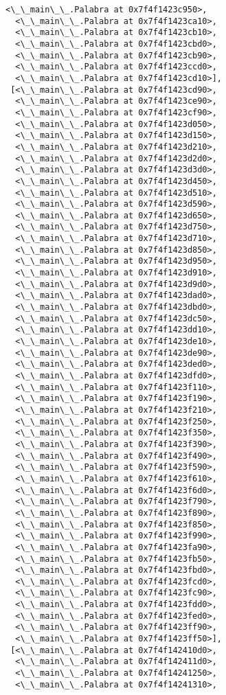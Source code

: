 \documentclass[12pt,a4paper,table]{article}
\begin{document}
\begin{tcolorbox}[breakable, size=fbox, boxrule=.5pt, pad at break*=1mm, opacityfill=0]
\begin{Verbatim}[commandchars=\\\{\}]
  <\_\_main\_\_.Palabra at 0x7f4f1423c950>,
  <\_\_main\_\_.Palabra at 0x7f4f1423ca10>,
  <\_\_main\_\_.Palabra at 0x7f4f1423cb10>,
  <\_\_main\_\_.Palabra at 0x7f4f1423cbd0>,
  <\_\_main\_\_.Palabra at 0x7f4f1423cb90>,
  <\_\_main\_\_.Palabra at 0x7f4f1423ccd0>,
  <\_\_main\_\_.Palabra at 0x7f4f1423cd10>],
 [<\_\_main\_\_.Palabra at 0x7f4f1423cd90>,
  <\_\_main\_\_.Palabra at 0x7f4f1423ce90>,
  <\_\_main\_\_.Palabra at 0x7f4f1423cf90>,
  <\_\_main\_\_.Palabra at 0x7f4f1423d050>,
  <\_\_main\_\_.Palabra at 0x7f4f1423d150>,
  <\_\_main\_\_.Palabra at 0x7f4f1423d210>,
  <\_\_main\_\_.Palabra at 0x7f4f1423d2d0>,
  <\_\_main\_\_.Palabra at 0x7f4f1423d3d0>,
  <\_\_main\_\_.Palabra at 0x7f4f1423d450>,
  <\_\_main\_\_.Palabra at 0x7f4f1423d510>,
  <\_\_main\_\_.Palabra at 0x7f4f1423d590>,
  <\_\_main\_\_.Palabra at 0x7f4f1423d650>,
  <\_\_main\_\_.Palabra at 0x7f4f1423d750>,
  <\_\_main\_\_.Palabra at 0x7f4f1423d710>,
  <\_\_main\_\_.Palabra at 0x7f4f1423d850>,
  <\_\_main\_\_.Palabra at 0x7f4f1423d950>,
  <\_\_main\_\_.Palabra at 0x7f4f1423d910>,
  <\_\_main\_\_.Palabra at 0x7f4f1423d9d0>,
  <\_\_main\_\_.Palabra at 0x7f4f1423dad0>,
  <\_\_main\_\_.Palabra at 0x7f4f1423dbd0>,
  <\_\_main\_\_.Palabra at 0x7f4f1423dc50>,
  <\_\_main\_\_.Palabra at 0x7f4f1423dd10>,
  <\_\_main\_\_.Palabra at 0x7f4f1423de10>,
  <\_\_main\_\_.Palabra at 0x7f4f1423de90>,
  <\_\_main\_\_.Palabra at 0x7f4f1423ded0>,
  <\_\_main\_\_.Palabra at 0x7f4f1423dfd0>,
  <\_\_main\_\_.Palabra at 0x7f4f1423f110>,
  <\_\_main\_\_.Palabra at 0x7f4f1423f190>,
  <\_\_main\_\_.Palabra at 0x7f4f1423f210>,
  <\_\_main\_\_.Palabra at 0x7f4f1423f250>,
  <\_\_main\_\_.Palabra at 0x7f4f1423f350>,
  <\_\_main\_\_.Palabra at 0x7f4f1423f390>,
  <\_\_main\_\_.Palabra at 0x7f4f1423f490>,
  <\_\_main\_\_.Palabra at 0x7f4f1423f590>,
  <\_\_main\_\_.Palabra at 0x7f4f1423f610>,
  <\_\_main\_\_.Palabra at 0x7f4f1423f6d0>,
  <\_\_main\_\_.Palabra at 0x7f4f1423f790>,
  <\_\_main\_\_.Palabra at 0x7f4f1423f890>,
  <\_\_main\_\_.Palabra at 0x7f4f1423f850>,
  <\_\_main\_\_.Palabra at 0x7f4f1423f990>,
  <\_\_main\_\_.Palabra at 0x7f4f1423fa90>,
  <\_\_main\_\_.Palabra at 0x7f4f1423fb50>,
  <\_\_main\_\_.Palabra at 0x7f4f1423fbd0>,
  <\_\_main\_\_.Palabra at 0x7f4f1423fcd0>,
  <\_\_main\_\_.Palabra at 0x7f4f1423fc90>,
  <\_\_main\_\_.Palabra at 0x7f4f1423fdd0>,
  <\_\_main\_\_.Palabra at 0x7f4f1423fed0>,
  <\_\_main\_\_.Palabra at 0x7f4f1423ff90>,
  <\_\_main\_\_.Palabra at 0x7f4f1423ff50>],
 [<\_\_main\_\_.Palabra at 0x7f4f142410d0>,
  <\_\_main\_\_.Palabra at 0x7f4f142411d0>,
  <\_\_main\_\_.Palabra at 0x7f4f14241250>,
  <\_\_main\_\_.Palabra at 0x7f4f14241310>,

\end{Verbatim}
\end{tcolorbox}
\end{document}
